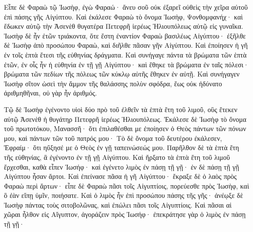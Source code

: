 {Εἶπε δὲ Φαραὼ τῷ Ἰωσὴφ, ἐγὼ Φαραώ· ἄνευ σοῦ οὐκ ἐξαρεῖ οὐθεὶς τὴν χεῖρα αὐτοῦ ἐπὶ πάσης γῆς Αἰγύπτου.
Καὶ ἐκάλεσε Φαραὼ τὸ ὄνομα Ἰωσὴφ, Ψονθομφανήχ· καὶ ἔδωκεν αὐτῷ τὴν Ἀσενὲθ θυγατέρα Πετεφρῆ ἱερέως Ἡλιουπόλεως αὐτῷ εἰς γυναῖκα.
Ἰωσὴφ δὲ ἦν ἐτῶν τριάκοντα, ὅτε ἔστη ἐναντίον Φαραὼ βασιλέως Αἰγύπτου· ἐξῆλθε δὲ Ἰωσὴφ ἀπὸ προσώπου Φαραὼ, καὶ διῆλθε πᾶσαν γῆν Αἰγύπτου.
Καὶ ἐποίησεν ἡ γῆ ἐν τοῖς ἑπτὰ ἔτεσι τῆς εὐθηνίας δράγματα.
Καὶ συνήγαγε πάντα τὰ βρώματα τῶν ἑπτὰ ἐτῶν, ἐν οἷς ἦν ἡ εὐθηνία ἐν τῇ γῇ Αἰγύπτου· καὶ ἔθηκε τὰ βρώματα ἐν ταῖς πόλεσι· βρώματα τῶν πεδίων τῆς πόλεως τῶν κύκλῳ αὐτῆς ἔθηκεν ἐν αὐτῇ.
Καὶ συνήγαγεν Ἰωσὴφ σῖτον ὡσεὶ τὴν ἄμμον τῆς θαλάσσης πολὺν σφόδρα, ἕως οὐκ ἠδύνατο ἀριθμηθῆναι, οὐ γὰρ ἦν ἀριθμός.
\par }{\PP {}Τῷ δὲ Ἰωσὴφ ἐγένοντο υἱοὶ δύο πρὸ τοῦ ἐλθεῖν τὰ ἑπτὰ ἔτη τοῦ λιμοῦ, οὓς ἔτεκεν αὐτῷ Ἀσενὲθ ἡ θυγάτηρ Πετεφρῆ ἱερέως Ἡλιουπόλεως.
Ἐκάλεσε δὲ Ἰωσὴφ τὸ ὄνομα τοῦ πρωτοτόκου, Μανασσῆ· ὅτι ἐπιλαθέσθαι με ἐποίησεν ὁ Θεὸς πάντων τῶν πόνων μου, καὶ πάντων τῶν τοῦ πατρός μου·
Τὸ δὲ ὄνομα τοῦ δευτέρου ἐκάλεσεν, Ἐφραίμ· ὅτι ηὔξησέ με ὁ Θεὸς ἐν γῇ ταπεινώσεώς μου.
Παρῆλθον δὲ τὰ ἑπτὰ ἔτη τῆς εὐθηνίας, ἃ ἐγένοντο ἐν τῇ γῇ Αἰγύπτου.
Καὶ ἤρξατο τὰ ἑπτὰ ἔτη τοῦ λιμοῦ ἔρχεσθαι, καθὰ εἶπεν Ἰωσήφ· καὶ ἐγένετο λιμὸς ἐν πάσῃ τῇ γῇ· ἐν δὲ πάσῃ τῇ γῇ Αἰγύπτου ἦσαν ἄρτοι.
Καὶ ἐπείνασε πᾶσα ἡ γῆ Αἰγύπτου· ἔκραξε δὲ ὁ λαὸς πρὸς Φαραὼ περὶ ἄρτων· εἶπε δὲ Φαραὼ πᾶσι τοῖς Αἰγυπτίοις, πορεύεσθε πρὸς Ἰωσὴφ, καὶ ὃ ἐὰν εἴπῃ ὑμῖν, ποιήσατε.
Καὶ ὁ λιμὸς ἦν ἐπὶ προσώπου πάσης τῆς γῆς· ἀνέῳξε δὲ Ἰωσὴφ πάντας τοὺς σιτοβολῶνας, καὶ ἐπώλει πᾶσι τοῖς Αἰγυπτίοις.
Καὶ πᾶσαι αἱ χῶραι ἦλθον εἰς Αἴγυπτον, ἀγοράζειν πρὸς Ἰωσήφ· ἐπεκράτησε γὰρ ὁ λιμὸς ἐν πάσῃ τῇ γῇ·

}
